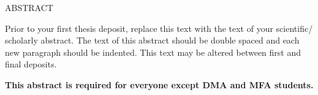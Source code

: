 \begin{doublespace}
\begin{tightcenter}
ABSTRACT
\mylinespacing
\end{tightcenter}

Prior to your first thesis deposit, replace this text with the text of your scientific/ scholarly abstract. The text of this abstract should be double spaced and each new paragraph should be indented. This text may be altered between first and final deposits.

\mylinespacing
\mylinespacing
\begin{tightcenter}
\textbf{This abstract is required for everyone except DMA and MFA students.}
\end{tightcenter}
\end{doublespace}
